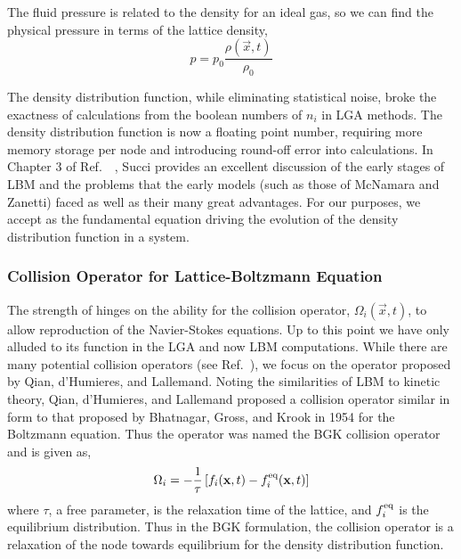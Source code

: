 The fluid pressure is related to the density for an ideal gas, so we can find the physical pressure in terms of the lattice density,
\begin{equation}
	p = p_0\frac{\rho(\vec{x},t)}{\rho_0}
\end{equation}

The density distribution function, while eliminating statistical noise, broke the exactness of calculations from the boolean numbers of $n_i$ in LGA methods. The density distribution function is now a floating point number, requiring more memory storage per node and introducing round-off error into calculations. In Chapter 3 of Ref.~\cite{succi2001lattice}~, Succi provides an excellent discussion of the early stages of LBM and the problems that the early models (such as those of McNamara and Zanetti) faced as well as their many great advantages. For our purposes, we accept  as the fundamental equation driving the evolution of the density distribution function in a system.



\subsubsection{Collision Operator for Lattice-Boltzmann Equation}

The strength of  hinges on the ability for the collision operator, $\Omega_i(\vec{x},t)$, to allow reproduction of the Navier-Stokes equations. Up to this point we have only alluded to its function in the LGA and now LBM computations. While there are many potential collision operators (see Ref.~\cite{succi2001lattice}), we focus on the operator proposed by Qian, d’Humieres, and Lallemand.\cite{qian1992lattice} Noting the similarities of LBM to kinetic theory, Qian, d'Humieres, and Lallemand proposed a collision operator similar in form to that proposed by Bhatnagar, Gross, and Krook in 1954 for the Boltzmann equation.\cite{Bhatnagar1954a} Thus the operator was named the BGK collision operator and is given as,
\begin{equation}\label{eq:bgk-operator}
	\Omega_i = -\frac{1}{\tau}\left[f_i(\mathbf{x},t) - f_i^{\text{eq}}(\mathbf{x},t)\right]
\end{equation}
where $\tau$, a free parameter, is the relaxation time of the lattice, and $f_i^{\text{eq}}$ is the equilibrium distribution. Thus in the BGK formulation, the collision operator is a relaxation of the node towards equilibrium for the density distribution function.\cite{Bhatnagar1954a}

